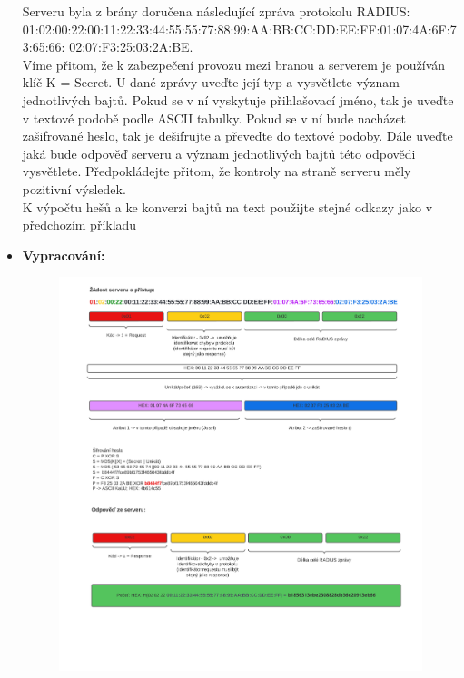 \documentclass[10pt, a4paper]{article}%
\begin{document}
\begin{itemize}[label={}]
		Serveru byla z brány doručena následující zpráva protokolu RADIUS:\\
		01:02:00:22:00:11:22:33:44:55:55:77:88:99:AA:BB:CC:DD:EE:FF:01:07:4A:6F:73:65:66:
		02:07:F3:25:03:2A:BE.\\
		Víme přitom, že k zabezpečení provozu mezi branou a serverem je používán klíč K = Secret.
		U dané zprávy uveďte její typ a vysvětlete význam jednotlivých bajtů. Pokud se v ní vyskytuje
		přihlašovací jméno, tak je uveďte v textové podobě podle ASCII tabulky. Pokud se v ní bude
		nacházet zašifrované heslo, tak je dešifrujte a převeďte do textové podoby. Dále uveďte jaká bude
		odpověď serveru a význam jednotlivých bajtů této odpovědi vysvětlete. Předpokládejte přitom, že
		kontroly na straně serveru měly pozitivní výsledek.\\
		K výpočtu hešů a ke konverzi bajtů na text použijte stejné odkazy jako v předchozím příkladu
		\item \textbf{Vypracování:}\\

		\begin{figure}[ht!]
			\centering
			\includegraphics[width = 1\textwidth]{RADIUS.png}
			
		\end{figure}
	\end{itemize}
\end{document}
